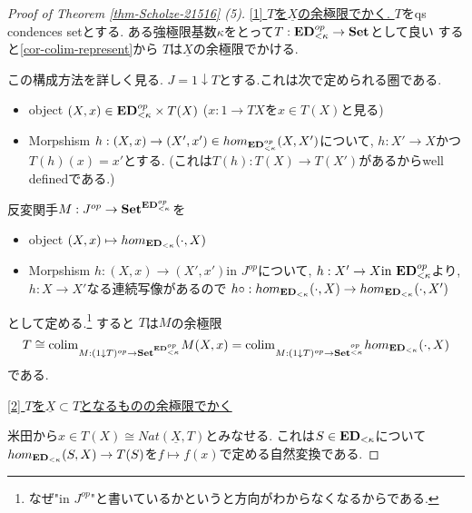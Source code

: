 \documentclass[dvipdfmx,a4paper,11pt]{article}
\newcommand{\colim}{{\rm colim}}
\theoremstyle{definition}
\begin{document}
\begin{proof}[Proof of Theorem \ref{thm-Scholze-21516} (5)]

\underline{[1] $T$を$\underline{X}$の余極限でかく. }
$T$をqs condences setとする.
ある強極限基数$\kappa$をとって$T : {\bf ED}_{<\kappa}^{op} \to {\bf Set}$として良い
すると\ref{cor-colim-represent}から
$T$は$\underline{X}$の余極限でかける.

この構成方法を詳しく見る.
$J = 1\downarrow T$とする.これは次で定められる圏である.
\begin{itemize}
\item object $(X, x) \in {\bf ED}_{<\kappa}^{op} \times T(X)$ ($x : 1 \to TX$を$x \in T(X)$と見る)
\item Morpshism $h : (X, x) \to (X', x') \in hom_{{\bf ED}_{<\kappa}^{op} } (X, X')$について, $h : X' \to X$かつ$T(h)(x)=x'$とする. (これは$T(h) : T(X) \to T(X')$があるからwell definedである.)
\end{itemize}
反変関手$M : J^{op} \to {\bf Set}^{{\bf ED}_{<\kappa}^{op} }$を
\begin{itemize}
\item object $(X, x)  \mapsto hom_{{\bf ED}_{<\kappa}} (\cdot, X)$
\item Morpshism $h : (X, x) \to (X', x') \text{in $J^{op}$}$について, $h : X' \to X \text{in ${\bf ED}_{<\kappa}^{op}$}$より, $h : X \to X'$なる連続写像があるので
$h \circ : hom_{{\bf ED}_{<\kappa}} (\cdot, X) \to hom_{{\bf ED}_{<\kappa}} (\cdot, X')$
\end{itemize}
として定める.\footnote{なぜ"in $J^{op}$"と書いているかというと方向がわからなくなるからである. }
すると
$T$は$M$の余極限%
$$
T \cong  
\colim_{M : ( 1\downarrow T)^{op} \to {\bf Set }^{{\bf ED}_{<\kappa}^{op}}} M(X,x)
=\colim_{M : ( 1\downarrow T)^{op}\to  {\bf Set }^{{\bf }_{<\kappa}^{op}}}
hom_{ {\bf ED}_{<\kappa}}(\cdot, X)
$$
である.

\underline{[2] $T$を$\underline{X} \subset T$となるものの余極限でかく }

米田から$x \in T(X) \cong Nat(\underline{X}, T)$とみなせる. これは$S \in {\bf ED}_{< \kappa}$について
$hom_{ {\bf ED}_{<\kappa}}(S, X) \to T(S)$を$f \mapsto f(x)$で定める自然変換である. 


\end{proof}
\end{document}
